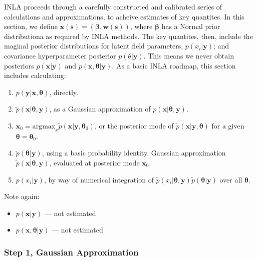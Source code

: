 \documentclass{article}
\begin{document}
INLA proceeds through a carefully constructed and calibrated series of calculations and approximations, to acheive estimates of key quantites. In this section, we define $\pmb{x}(\pmb{s}) = (\pmb{\beta},\pmb{w}(\pmb{s}))$, where $\pmb{\beta}$ has a Normal prior distributiona as required by INLA methods. The key quantites, then, include the maginal posterior distributions for latent field parameters, $p(x_{i}|\pmb{y})$; and covariance hyperparameter posterior $p(\theta|\pmb{y})$. This means we never obtain posteriors $p(\pmb{x}|\pmb{y})$ and $p(\pmb{x},\pmb{\theta}|\pmb{y})$. As a basic INLA roadmap, this section includes calculating:
\begin{enumerate}
\item $p(\pmb{y}|\pmb{x},\pmb{\theta})$, directly.
\item $\tilde{p}(\pmb{x}|\pmb{\theta}, \pmb{y})$, as a Gaussian approximation of $p(\pmb{x}|\pmb{\theta}, \pmb{y})$.
\item $\pmb{x}_{0} = \text{argmax}_{x}\tilde{p}(\pmb{x}|\pmb{y},\pmb{\theta}_{0})$, or the posterior mode of $\tilde{p}(\pmb{x}|\pmb{y},\pmb{\theta})$ for a given $\pmb{\theta} = \pmb{\theta}_{0}$.
\item $\tilde{p}(\pmb{\theta}|\pmb{y})$, using a basic probability identity, Gaussian approximation $\tilde{p}(\pmb{x}|\pmb{\theta}, \pmb{y})$, evaluated at posterior mode $\pmb{x}_{0}$.
\item $p(x_{i}|\pmb{y})$, by way of numerical integration of $\tilde{p}(x_{i}|\pmb{\theta}, \pmb{y}) \tilde{p}(\pmb{\theta} |\pmb{y})$ over all $\pmb{\theta}$.
\end{enumerate}
Note again:
\begin{itemize}
\item $p(\pmb{x}|\pmb{y})$ --- not estimated
\item $p(\pmb{x}, \pmb{\theta}| \pmb{y})$ --- not estimated
\end{itemize}

\subsubsection*{Step 1, Gaussian Approximation} %
\end{document}
